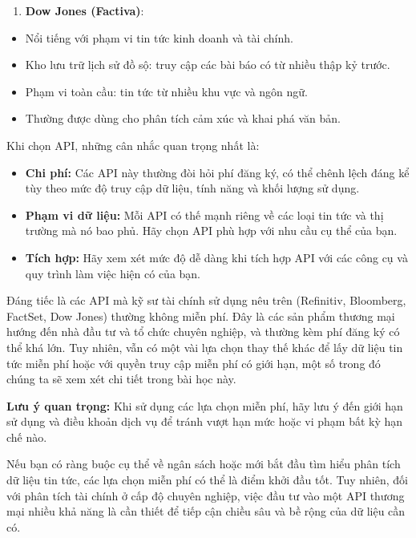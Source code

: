 \begin{enumerate}
\def\labelenumi{\arabic{enumi}.}
\setcounter{enumi}{3}
\item
  \textbf{Dow Jones (Factiva)}:
\end{enumerate}

\begin{itemize}
\item
  Nổi tiếng với phạm vi tin tức kinh doanh và tài chính.
\item
  Kho lưu trữ lịch sử đồ sộ: truy cập các bài báo có từ nhiều thập kỷ trước.
\item
  Phạm vi toàn cầu: tin tức từ nhiều khu vực và ngôn ngữ.
\item
  Thường được dùng cho phân tích cảm xúc và khai phá văn bản.
\end{itemize}

Khi chọn API, những cân nhắc quan trọng nhất là:

\begin{itemize}
\item
  \textbf{Chi phí:} Các API này thường đòi hỏi phí đăng ký, có thể chênh lệch đáng kể tùy theo mức độ truy cập dữ liệu, tính năng và khối lượng sử dụng.
\item
  \textbf{Phạm vi dữ liệu:} Mỗi API có thế mạnh riêng về các loại tin tức và thị trường mà nó bao phủ. Hãy chọn API phù hợp với nhu cầu cụ thể của bạn.
\item
  \textbf{Tích hợp:} Hãy xem xét mức độ dễ dàng khi tích hợp API với các công cụ và quy trình làm việc hiện có của bạn.
\end{itemize}

Đáng tiếc là các API mà kỹ sư tài chính sử dụng nêu trên (Refinitiv, Bloomberg, FactSet, Dow Jones) thường không miễn phí. Đây là các sản phẩm thương mại hướng đến nhà đầu tư và tổ chức chuyên nghiệp, và thường kèm phí đăng ký có thể khá lớn. Tuy nhiên, vẫn có một vài lựa chọn thay thế khác để lấy dữ liệu tin tức miễn phí hoặc với quyền truy cập miễn phí có giới hạn, một số trong đó chúng ta sẽ xem xét chi tiết trong bài học này.

\textbf{Lưu ý quan trọng:} Khi sử dụng các lựa chọn miễn phí, hãy lưu ý đến giới hạn sử dụng và điều khoản dịch vụ để tránh vượt hạn mức hoặc vi phạm bất kỳ hạn chế nào.

Nếu bạn có ràng buộc cụ thể về ngân sách hoặc mới bắt đầu tìm hiểu phân tích dữ liệu tin tức, các lựa chọn miễn phí có thể là điểm khởi đầu tốt. Tuy nhiên, đối với phân tích tài chính ở cấp độ chuyên nghiệp, việc đầu tư vào một API thương mại nhiều khả năng là cần thiết để tiếp cận chiều sâu và bề rộng của dữ liệu cần có.

